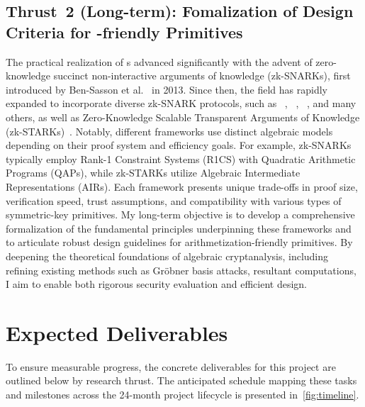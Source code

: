 	\subsection{Thrust~2 (Long-term): Fomalization of Design Criteria for -friendly Primitives}
	The practical realization of s advanced significantly with the advent of zero-knowledge succinct non-interactive arguments of knowledge (zk-SNARKs), first introduced by Ben-Sasson et al.~\cite{DBLP:conf/uss/Ben-SassonCTV14} in 2013.
	Since then, the field has rapidly expanded to incorporate diverse zk-SNARK protocols, such as ~\cite{DBLP:journals/cacm/ParnoHG016}, ~\cite{DBLP:conf/eurocrypt/Groth16}, ~\cite{DBLP:journals/iacr/GabizonWC19}, and many others, as well as Zero-Knowledge Scalable Transparent Arguments of Knowledge (zk-STARKs)~\cite{DBLP:conf/crypto/Ben-SassonBHR19}.
	Notably, different  frameworks use distinct algebraic models depending on their proof system and efficiency goals.
	For example, zk-SNARKs typically employ Rank-1 Constraint Systems (R1CS) with Quadratic Arithmetic Programs (QAPs), while zk-STARKs utilize Algebraic Intermediate Representations (AIRs).
	Each framework presents unique trade-offs in proof size, verification speed, trust assumptions, and compatibility with various types of symmetric-key primitives.
	My long-term objective is to develop a comprehensive formalization of the fundamental principles underpinning these frameworks and to articulate robust design guidelines for arithmetization-friendly primitives.
	By deepening the theoretical foundations of algebraic cryptanalysis, including refining existing methods such as Gr\"obner basis attacks, resultant computations, I aim to enable both rigorous security evaluation and efficient design.
	
	\section{Expected Deliverables}
	To ensure measurable progress, the concrete deliverables for this project are outlined below by research thrust.
	The anticipated schedule mapping these tasks and milestones across the 24-month project lifecycle is presented in~\cref{fig:timeline}.
	
